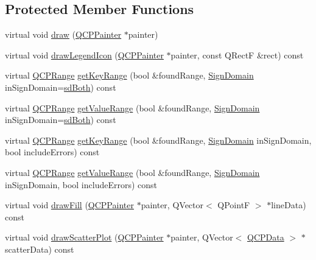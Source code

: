 \subsection*{Protected Member Functions}
\begin{DoxyCompactItemize}
\item 
virtual void \hyperlink{classQCPGraph_a659218cc62c2a7786213d9dd429c1c8d}{draw} (\hyperlink{classQCPPainter}{Q\+C\+P\+Painter} $\ast$painter)
\item 
virtual void \hyperlink{classQCPGraph_a32115df0e940cf8ca7b687873c2d02ee}{draw\+Legend\+Icon} (\hyperlink{classQCPPainter}{Q\+C\+P\+Painter} $\ast$painter, const Q\+RectF \&rect) const 
\item 
virtual \hyperlink{classQCPRange}{Q\+C\+P\+Range} \hyperlink{classQCPGraph_afc246ce6201ff564ac440efaec52ab11}{get\+Key\+Range} (bool \&found\+Range, \hyperlink{classQCPAbstractPlottable_a661743478a1d3c09d28ec2711d7653d8}{Sign\+Domain} in\+Sign\+Domain=\hyperlink{classQCPAbstractPlottable_a661743478a1d3c09d28ec2711d7653d8a082b98cfb91a7363a3b5cd17b0c1cd60}{sd\+Both}) const 
\item 
virtual \hyperlink{classQCPRange}{Q\+C\+P\+Range} \hyperlink{classQCPGraph_a856e90b8ab6b31c344b14a863ab9e5d2}{get\+Value\+Range} (bool \&found\+Range, \hyperlink{classQCPAbstractPlottable_a661743478a1d3c09d28ec2711d7653d8}{Sign\+Domain} in\+Sign\+Domain=\hyperlink{classQCPAbstractPlottable_a661743478a1d3c09d28ec2711d7653d8a082b98cfb91a7363a3b5cd17b0c1cd60}{sd\+Both}) const 
\item 
virtual \hyperlink{classQCPRange}{Q\+C\+P\+Range} \hyperlink{classQCPGraph_aa75c6f028124032416a5cf7145dfba60}{get\+Key\+Range} (bool \&found\+Range, \hyperlink{classQCPAbstractPlottable_a661743478a1d3c09d28ec2711d7653d8}{Sign\+Domain} in\+Sign\+Domain, bool include\+Errors) const 
\item 
virtual \hyperlink{classQCPRange}{Q\+C\+P\+Range} \hyperlink{classQCPGraph_ab964a21d680af93435d68126d8c5ab29}{get\+Value\+Range} (bool \&found\+Range, \hyperlink{classQCPAbstractPlottable_a661743478a1d3c09d28ec2711d7653d8}{Sign\+Domain} in\+Sign\+Domain, bool include\+Errors) const 
\item 
virtual void \hyperlink{classQCPGraph_ad6d07926e6d6b7cfa70258780d47b7a0}{draw\+Fill} (\hyperlink{classQCPPainter}{Q\+C\+P\+Painter} $\ast$painter, Q\+Vector$<$ Q\+PointF $>$ $\ast$line\+Data) const 
\item 
virtual void \hyperlink{classQCPGraph_a6bdc385b122ce06134d4196373ae2250}{draw\+Scatter\+Plot} (\hyperlink{classQCPPainter}{Q\+C\+P\+Painter} $\ast$painter, Q\+Vector$<$ \hyperlink{classQCPData}{Q\+C\+P\+Data} $>$ $\ast$scatter\+Data) const 

\end{DoxyCompactItemize}
